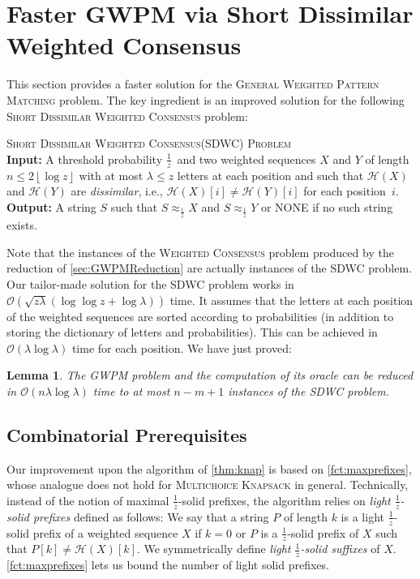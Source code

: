 \documentclass{article}
\theoremstyle{plain}
\newtheorem{lemma}[theorem]{Lemma}
\theoremstyle{definition}
\newenvironment{dsproblem}[1]
{\begin{center}\begin{lrbox}{\mybox}\begin{minipage}{0.96\columnwidth}#1 \textsc{Problem}\\}
{\end{minipage}\end{lrbox}\fbox{\usebox{\mybox}}\end{center}}
\newcommand{\defdsproblem}[3]{
  \begin{dsproblem}{#1}
\textbf{Input:} #2\\
\textbf{Output:} #3
  \end{dsproblem}
  }
\newcommand{\MK}{\textsc{Multichoice Knapsack}\xspace}
\newcommand{\GWPM}{\textsc{GWPM}\xspace}
\newcommand{\GWPMFull}{\textsc{General Weighted Pattern Matching}\xspace}
\newcommand{\WC}{\textsc{Weighted Consensus}\xspace}
\newcommand{\SDWCFull}{\textsc{Short Dissimilar Weighted Consensus}\xspace}
\newcommand{\SDWC}{\textsc{SDWC}\xspace}
\newcommand{\floor}[1]{\left\lfloor #1 \right\rfloor}
\newcommand{\Oh}{\mathcal{O}}
\renewcommand{\H}{\mathcal{H}}
\newcommand{\fr}{\ensuremath{\frac1z}}
\newcommand{\match}{\approx_{\frac1z}}
\begin{document}
  
  







 
   
    
  
  \section{Faster \GWPM via Short Dissimilar Weighted Consensus}\label{app:SDWC}
  This section provides a faster solution for the \GWPMFull problem.
  The key ingredient is an improved solution for the following \SDWCFull problem:
     \defdsproblem{\SDWCFull (\SDWC)}{
      A  threshold probability \fr\ and two weighted sequences $X$ and $Y$ of length $n\le 2\floor{\log z}$ with at most $\lambda\le z$ letters at each position
      and such that  $\H(X)$ and $\H(Y)$ are \emph{dissimilar}, i.e., $\H(X)[i] \ne \H(Y)[i]$ for each position~$i$.
    }{
      A string $S$ such that $S \match X$ and $S \match Y$ or NONE if no such string exists.
    }
    
    Note that the instances of the \WC problem produced by the reduction of \cref{sec:GWPMReduction} are actually instances of the \SDWC problem.
    Our tailor-made solution for the \SDWC problem works in $\Oh(\sqrt{z\lambda} (\log\log z + \log \lambda))$ time.    
    It assumes that the letters at each position of the weighted sequences are sorted according to probabilities
    (in addition to storing the dictionary of letters and probabilities).
    This can be achieved in $\Oh(\lambda \log \lambda)$ time for each position.
    We have just proved:
    
   
    \begin{lemma}\label{lem:sdwc}
      The \GWPM problem and the computation of its oracle can be reduced
      in $\Oh(n \lambda \log \lambda)$ time to at most $n-m+1$ instances of the \SDWC problem.
    \end{lemma}     
   
   \subsection{Combinatorial Prerequisites}
    Our improvement upon the algorithm of \cref{thm:knap} is based on \cref{fct:maxprefixes}, 
    whose analogue does not hold for \MK in general.
    Technically, instead of the notion of maximal \fr-solid prefixes, the algorithm
    relies on \emph{light \fr-solid prefixes} defined as follows:
    We say that a string $P$ of length $k$ is a light \fr-solid prefix of a weighted sequence $X$ if $k=0$ or
    $P$ is a \fr-solid prefix of $X$ such that $P[k] \ne \H(X)[k]$. 
    We symmetrically define \emph{light \fr-solid suffixes} of $X$.
    \cref{fct:maxprefixes} lets us bound the number of light solid prefixes.
\end{document}
